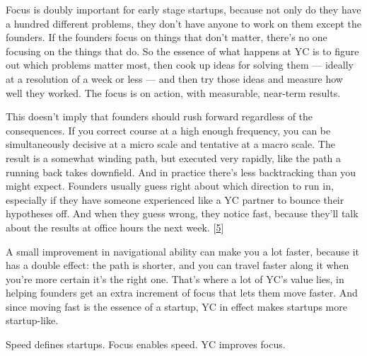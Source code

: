 Focus
                  is doubly important for early stage startups, because not only
                  do they have a hundred different problems, they don't have
                  anyone to work on them except the founders. If the founders
                  focus on things that don't matter, there's no one focusing on
                  the things that do. So the essence of what happens at YC is to
                  figure out which problems matter most, then cook up ideas for
                  solving them --- ideally at a resolution of a week or less
                  --- and then try those ideas and measure how well they
                  worked. The focus is on action, with measurable, near-term
                  results.

This doesn't imply that founders should
                  rush forward regardless of the consequences. If you correct
                  course at a high enough frequency, you can be simultaneously
                  decisive at a micro scale and tentative at a macro scale. The
                  result is a somewhat winding path, but executed very rapidly,
                  like the path a running back takes downfield. And in practice
                  there's less backtracking than you might expect. Founders
                  usually guess right about which direction to run in,
                  especially if they have someone experienced like a YC partner
                  to bounce their hypotheses off. And when they guess wrong,
                  they notice fast, because they'll talk about the results at
                  office hours the next week.
                  [\href{\#f5n}{5}]

A small improvement in navigational ability can
                  make you a lot faster, because it has a double effect: the
                  path is shorter, and you can travel faster along it when
                  you're more certain it's the right one. That's where a lot of
                  YC's value lies, in helping founders get an extra increment of
                  focus that lets them move faster. And since moving fast is the
                  essence of a startup, YC in effect makes startups more
                  startup-like.

Speed defines startups. Focus enables
                  speed. YC improves focus.

